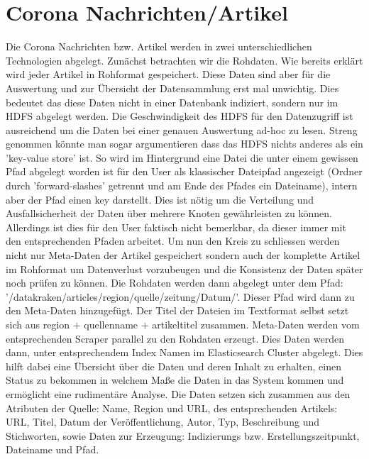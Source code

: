 \documentclass[12pt,oneside,a4paper,parskip]{scrbook}
\begin{document}
\section{Corona Nachrichten/Artikel}
Die Corona Nachrichten bzw. Artikel werden in zwei unterschiedlichen Technologien abgelegt. Zun\"achst betrachten wir die Rohdaten. Wie bereits erkl\"art wird jeder Artikel in Rohformat gespeichert. Diese Daten sind aber f\"ur die Auswertung und zur \"Ubersicht der Datensammlung erst mal unwichtig. Dies bedeutet das diese Daten nicht in einer Datenbank indiziert, sondern nur im HDFS abgelegt werden. Die Geschwindigkeit des HDFS f\"ur den Datenzugriff ist ausreichend um die Daten bei einer genauen Auswertung ad-hoc zu lesen. Streng genommen k\"onnte man sogar argumentieren dass das HDFS nichts anderes als ein 'key-value store' ist. So wird im Hintergrund eine Datei die unter einem gewissen Pfad abgelegt worden ist f\"ur den User als klassischer Dateipfad angezeigt (Ordner durch 'forward-slashes' getrennt und am Ende des Pfades ein Dateiname), intern aber der Pfad einen key darstellt. Dies ist n\"otig um die Verteilung und Ausfallsicherheit der Daten \"uber mehrere Knoten gew\"ahrleisten zu k\"onnen. Allerdings ist dies f\"ur den User faktisch nicht bemerkbar, da dieser immer mit den entsprechenden Pfaden arbeitet.
Um nun den Kreis zu schliessen werden nicht nur Meta-Daten der Artikel gespeichert sondern auch der komplette Artikel im Rohformat um Datenverlust vorzubeugen und die Konsistenz der Daten sp\"ater noch pr\"ufen zu k\"onnen. Die Rohdaten werden dann abgelegt unter dem Pfad: '/datakraken/articles/region/quelle/zeitung/Datum/'. Dieser Pfad wird dann zu den Meta-Daten hinzugef\"ugt. Der Titel der Dateien im Textformat selbst setzt sich aus region + quellenname + artikeltitel zusammen. \newline
 Meta-Daten werden vom entsprechenden Scraper parallel zu den Rohdaten erzeugt. Dies Daten werden dann, unter entsprechendem Index Namen im Elasticsearch Cluster abgelegt. Dies hilft dabei eine \"Ubersicht über die Daten und deren Inhalt zu erhalten, einen Status zu bekommen in welchem Maße die Daten in das System kommen und erm\"oglicht eine rudiment\"are Analyse. Die Daten setzen sich zusammen aus den Atributen der Quelle: Name, Region und URL, des entsprechenden Artikels: URL, Titel, Datum der Veröffentlichung, Autor, Typ, Beschreibung und Stichworten, sowie Daten zur Erzeugung: Indizierungs bzw. Erstellungszeitpunkt, Dateiname und Pfad.
\end{document}
